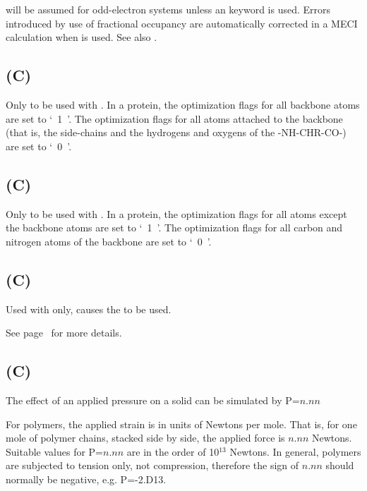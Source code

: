  will  be
   assumed  for odd-electron systems unless an  keyword is used.  Errors
   introduced by use of fractional occupancy are automatically corrected  in
   a MECI calculation when  is used. See also .
\subsection*{ (C)}
Only to be used with . In a protein, the optimization flags for all backbone atoms
are set to `~1~'.  The optimization flags for all atoms attached to the
backbone (that is, the side-chains and the hydrogens and oxygens of the -NH-CHR-CO-)
are set to `~0~'.

\subsection*{ (C)}
Only to be used with . In a protein, the optimization flags for all atoms except the backbone atoms
are set to `~1~'.  The optimization flags for all carbon and nitrogen atoms
of the backbone are set to `~0~'.

\subsection*{ (C)}
Used with  only,  causes the
 to
be used.
\begin{latexonly}
See page~\pageref{ort} for more details.
\end{latexonly}


\subsection*{ (C)}
 The effect of an applied pressure on a solid can be
simulated by P=$n.nn$

 For polymers, the applied strain is in units
of Newtons per mole. That is, for one mole of polymer chains,
stacked side by side, the applied force is $n.nn$ Newtons. Suitable
values for P=$n.nn$ are in the order of 10$^{13}$ Newtons. In general,
polymers are subjected to tension only, not compression, therefore
the sign of $n.nn$ should normally be negative, e.g. P=-2.D13.

